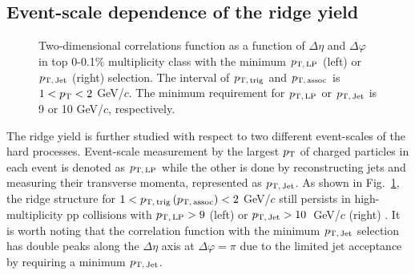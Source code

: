 \subsection{Event-scale dependence of the ridge yield}
\begin{figure}[h!]
	\centering
	\caption{ Two-dimensional correlations function as a function of $\Delta\eta$ and $\Delta\varphi$ in top 0-0.1\% multiplicity class with the minimum $p_\mathrm{T,\,LP}$ (left) or $p_\mathrm{T,\,Jet}$ (right) selection. The interval of $p_\mathrm{T,\,trig}$ and $p_\mathrm{T,\,assoc}$ is $1<p_\mathrm{T}<2$ GeV/$c$. The minimum requirement for $p_\mathrm{T,\,LP}$ or $p_\mathrm{T,\,Jet}$ is 9 or 10 GeV/$c$, respectively. }
	\label{fig:PlotCorrHMTSel}
\end{figure}

The ridge yield is further studied with respect to two different event-scales of the hard processes. Event-scale measurement by the largest $p_\mathrm{T}$ of charged particles in each event is denoted as $p_\mathrm{T,\,LP}$ while the other is done by reconstructing jets and measuring their transverse momenta, represented as $p_\mathrm{T,\,Jet}$. As shown in Fig.~\ref{fig:PlotCorrHMTSel}, the ridge structure for $1< p_\mathrm{T,\,trig}\,(p_\mathrm{T,\,assoc}) <2$ GeV/$c$ still persists in high-multiplicity pp collisions with $p_\mathrm{T,\,LP}>9$ (left) or $p_\mathrm{T,\,Jet}>10$~GeV/$c$ (right) .  %
It is worth noting that the correlation function with the minimum $p_\mathrm{T,\,Jet}$ selection has double peaks along the $\Delta\eta$ axis at $\Delta\varphi = \pi$ due to the limited jet acceptance by requiring a minimum $p_\mathrm{T,\,Jet}$.

